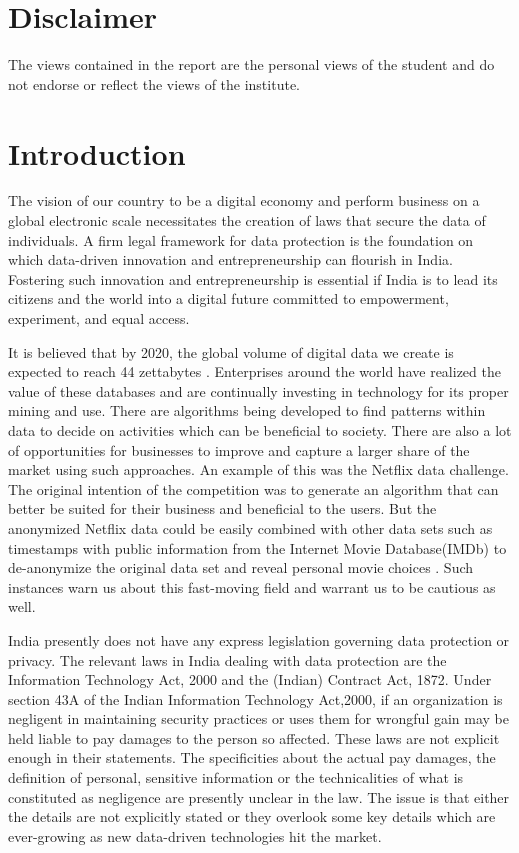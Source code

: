 \section{Disclaimer}
The views contained in the report are the personal views of the student and do not endorse or reflect the views of the institute.
\section{Introduction}
The vision of our country to be a digital economy and perform business on a global electronic scale necessitates the creation of laws that secure the data of individuals. A firm legal framework for data protection is the foundation on which data-driven innovation and entrepreneurship can flourish in India. Fostering such innovation and entrepreneurship is essential if India is to lead its citizens and the world into a digital future committed to empowerment, experiment, and equal access.
\par
It is believed that by 2020, the global volume of digital data we create is expected to reach 44 zettabytes \cite{digitalworld}. Enterprises around the world have realized the value of these databases and are continually investing in technology for its proper mining and use. There are algorithms being developed to find patterns within data to decide on activities which can be beneficial to society. There are also a lot of opportunities for businesses to improve and capture a larger share of the market using such approaches. An example of this was the Netflix data challenge. The original intention of the competition was to generate an algorithm that can better be suited for their business and beneficial to the users. But the anonymized Netflix data could be easily combined with other data sets such as timestamps with public information from the Internet Movie Database(IMDb) to de-anonymize the original data set and reveal personal movie choices \cite{netflix}. Such instances warn us about this fast-moving field and warrant us to be cautious as well.
\par
India presently does not have any express legislation governing data protection or privacy. The relevant laws in India dealing with data protection are the Information Technology Act, 2000 and the (Indian) Contract Act, 1872. Under section 43A of the Indian Information Technology Act,2000, if an organization is negligent in maintaining security practices or uses them for wrongful gain may be held liable to pay damages to the person so affected. These laws are not explicit enough in their statements. The specificities about the actual pay damages, the definition of personal, sensitive information or the technicalities of what is constituted as negligence are presently unclear in the law. The issue is that either the details are not explicitly stated or they overlook some key details which are ever-growing as new data-driven technologies hit the market.

